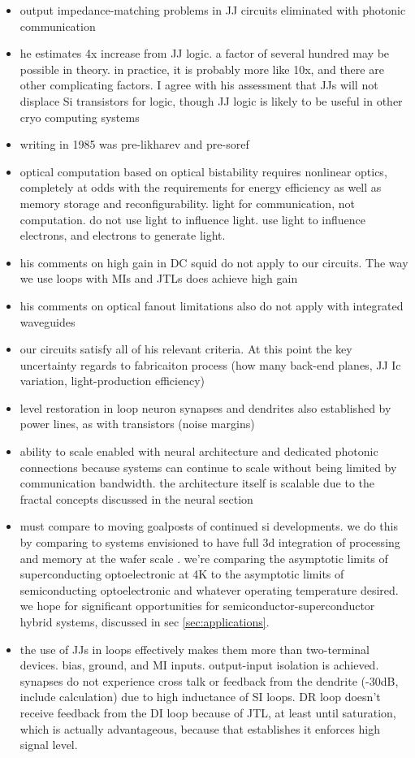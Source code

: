 \begin{itemize}
\item output impedance-matching problems in JJ circuits eliminated with photonic communication
\item he estimates 4x increase from JJ logic. a factor of several hundred may be possible in theory. in practice, it is probably more like 10x, and there are other complicating factors. I agree with his assessment that JJs will not displace Si transistors for logic, though JJ logic is likely to be useful in other cryo computing systems
\item writing in 1985 was pre-likharev and pre-soref
\item optical computation based on optical bistability requires nonlinear optics, completely at odds with the requirements for energy efficiency as well as memory storage and reconfigurability. light for communication, not computation. do not use light to influence light. use light to influence electrons, and electrons to generate light.
\item his comments on high gain in DC squid do not apply to our circuits. The way we use loops with MIs and JTLs does achieve high gain
\item his comments on optical fanout limitations also do not apply with integrated waveguides
\item our circuits satisfy all of his relevant criteria. At this point the key uncertainty regards to fabricaiton process (how many back-end planes, JJ Ic variation, light-production efficiency)
\item level restoration in loop neuron synapses and dendrites also established by power lines, as with transistors (noise margins)
\item ability to scale enabled with neural architecture and dedicated photonic connections because systems can continue to scale without being limited by communication bandwidth. the architecture itself is scalable due to the fractal concepts discussed in the neural section
\item must compare to moving goalposts of continued si developments. we do this by comparing to systems envisioned to have full 3d integration of processing and memory at the wafer scale \cite{kuwa2017}. we're comparing the asymptotic limits of superconducting optoelectronic at 4K to the asymptotic limits of semiconducting optoelectronic and whatever operating temperature desired. we hope for significant opportunities for semiconductor-superconductor hybrid systems, discussed in sec \ref{sec:applications}.
\item the use of JJs in loops effectively makes them more than two-terminal devices. bias, ground, and MI inputs. output-input isolation is achieved. synapses do not experience cross talk or feedback from the dendrite (-30dB, include calculation) due to high inductance of SI loops. DR loop doesn't receive feedback from the DI loop because of JTL, at least until saturation, which is actually advantageous, because that establishes it enforces high signal level.

\end{itemize}
